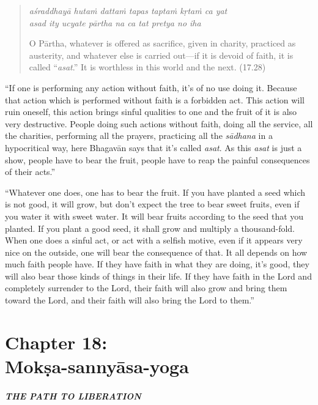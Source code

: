 \documentclass[12pt, twoside, openright]{memoir}
\begin{document}
\par
\begin{verse}
\textit{aśraddhayā hutaṁ dattaṁ tapas taptaṁ kṛtaṁ ca yat} \\
\textit{asad ity ucyate pārtha na ca tat pretya no iha}

\noindent O Pārtha, whatever is offered as sacrifice, given in charity, practiced as austerity, and whatever else is carried out---if it is devoid of faith, it is called \enquote{\textit{asat}.} It is worthless in this world and the next. (17.28)
\end{verse}
\par


\enquote{If one is performing any action without faith, it’s of no use doing it. Because that action which is performed without faith is a forbidden act. This action will ruin oneself, this action brings sinful qualities to one and the fruit of it is also very destructive. People doing such actions without faith, doing all the service, all the charities, performing all the prayers, practicing all the \textit{sādhana} in a hypocritical way, here Bhagavān says that it’s called \textit{asat}. As this \textit{asat} is just a show, people have to bear the fruit, people have to reap the painful consequences of their acts.}

\enquote{Whatever one does, one has to bear the fruit. If you have planted a seed which is not good, it will grow, but don’t expect the tree to bear sweet fruits, even if you water it with sweet water. It will bear fruits according to the seed that you planted. If you plant a good seed, it shall grow and multiply a thousand-fold. When one does a sinful act, or act with a selfish motive, even if it appears very nice on the outside, one will bear the consequence of that. It all depends on how much faith people have. If they have faith in what they are doing, it’s good, they will also bear those kinds of things in their life. If they have faith in the Lord and completely surrender to the Lord, their faith will also grow and bring them toward the Lord, and their faith will also bring the Lord to them.}

 \chapter{Chapter 18: \\Mokṣa-sannyāsa-yoga}\label{chap-moksa-sannyasa-yoga}

\paragraph*{\MakeUppercase{The Path to Liberation}}
\end{document}
